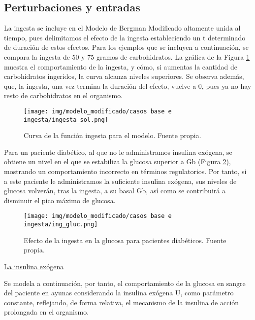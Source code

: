 \subsection{Perturbaciones y entradas}

La ingesta se incluye en el Modelo de Bergman Modificado altamente unida al tiempo, pues delimitamos el efecto de la ingesta estableciendo un t determinado de duración de estos efectos. 
Para los ejemplos que se incluyen a continuación, se compara la ingesta de 50 y 75 gramos de carbohidratos. La gráfica de la Figura \ref{fig:ingesta_solo} muestra el comportamiento de la ingesta, y cómo, si aumentas la cantidad de carbohidratos ingeridos, la curva alcanza niveles superiores. Se observa además, que, la ingesta, una vez termina la duración del efecto, vuelve a 0, pues ya no hay resto de carbohidratos en el organismo.

\begin{figure}[htbp]
    \centering
    \texttt{[image: img/modelo\_modificado/casos base e ingesta/ingesta\_sol.png]}
    \caption{Curva de la función ingesta para el modelo. Fuente propia.}
    \label{fig:ingesta_solo}
\end{figure}

Para un paciente diabético, al que no le administramos insulina exógena, se obtiene un nivel en el que se estabiliza la glucosa superior a Gb (Figura \ref{fig:ingesta_glucosa}), mostrando un comportamiento incorrecto en términos regulatorios. Por tanto, si a este paciente le administramos la suficiente insulina exógena, sus niveles de glucosa volverán, tras la ingesta, a su basal Gb, así como se contribuirá a disminuir el pico máximo de glucosa.
\clearpage
\begin{figure}[htbp]
    \centering
    \texttt{[image: img/modelo\_modificado/casos base e ingesta/ing\_gluc.png]}
    \caption{Efecto de la ingesta en la glucosa para pacientes diabéticos. Fuente propia.}
    \label{fig:ingesta_glucosa}
\end{figure}

\underline{La insulina exógena} 

Se modela a continuación, por tanto, el comportamiento de la glucosa en sangre del paciente en ayunas considerando la insulina exógena U, como parámetro constante, reflejando, de forma relativa, el mecanismo de la insulina de acción prolongada en el organismo. 

